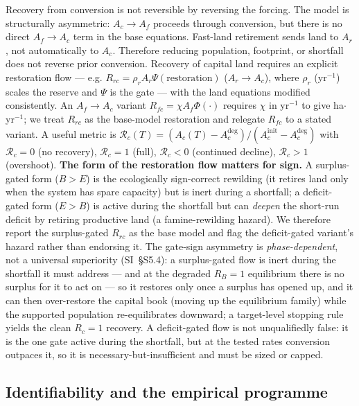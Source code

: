 \documentclass[11pt]{article}
\begin{document}
Recovery from conversion is not reversible by reversing the forcing. The model is structurally asymmetric: $A_c\to A_f$ proceeds through conversion, but there is no direct $A_f\to A_c$ term in the base equations. Fast-land retirement sends land to $A_r$, not automatically to $A_c$. Therefore reducing population, footprint, or shortfall does not reverse prior conversion. Recovery of capital land requires an explicit restoration flow --- e.g. $R_{rc}=\rho_rA_r\Psi(\text{restoration})$ ($A_r\to A_c$), where $\rho_r$ (yr$^{-1}$) scales the reserve and $\Psi$ is the gate --- with the land equations modified consistently. An $A_f\to A_c$ variant $R_{fc}=\chi A_f\Phi(\cdot)$ requires $\chi$ in yr$^{-1}$ to give ha$\cdot$yr$^{-1}$; we treat $R_{rc}$ as the base-model restoration and relegate $R_{fc}$ to a stated variant. A useful metric is $\mathcal{R}_c(T)=(A_c(T)-A_c^{\mathrm{deg}})/(A_c^{\mathrm{init}}-A_c^{\mathrm{deg}})$ with $\mathcal{R}_c=0$ (no recovery), $\mathcal{R}_c=1$ (full), $\mathcal{R}_c<0$ (continued decline), $\mathcal{R}_c>1$ (overshoot). \textbf{The form of the restoration flow matters for sign.} A surplus-gated form ($B>E$) is the ecologically sign-correct rewilding (it retires land only when the system has spare capacity) but is inert during a shortfall; a deficit-gated form ($E>B$) is active during the shortfall but can \emph{deepen} the short-run deficit by retiring productive land (a famine-rewilding hazard). We therefore report the surplus-gated $R_{rc}$ as the base model and flag the deficit-gated variant's hazard rather than endorsing it. The gate-sign asymmetry is \emph{phase-dependent}, not a universal superiority (SI~\S S5.4): a surplus-gated flow is inert during the shortfall it must address --- and at the degraded $R_B=1$ equilibrium there is no surplus for it to act on --- so it restores only once a surplus has opened up, and it can then over-restore the capital book (moving up the equilibrium family) while the supported population re-equilibrates downward; a target-level stopping rule yields the clean $R_c=1$ recovery. A deficit-gated flow is not unqualifiedly false: it is the one gate active during the shortfall, but at the tested rates conversion outpaces it, so it is necessary-but-insufficient and must be sized or capped.

\subsection{Identifiability and the empirical programme}
\end{document}
